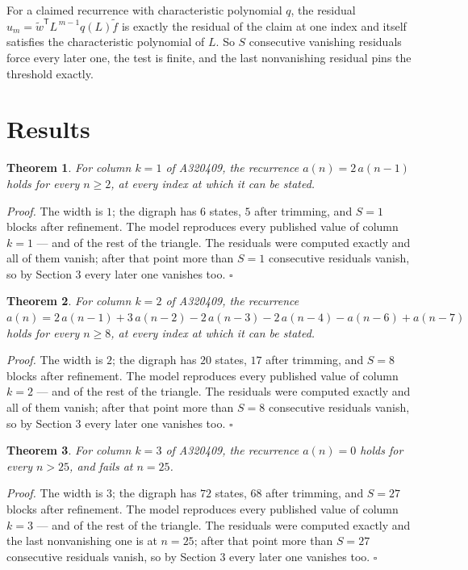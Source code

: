 \documentclass[11pt]{article}
\newtheorem{theorem}{Theorem}
\theoremstyle{definition}
\begin{document}
For a claimed recurrence with characteristic polynomial $q$, the residual $u_m = \tilde w^{\mathsf T}L^{\,m-1}q(L)\tilde f$ is exactly the residual of the claim at one index and itself satisfies the characteristic polynomial of $L$. So $S$ consecutive vanishing residuals force every later one, the test is finite, and the last nonvanishing residual pins the threshold exactly.

\section{Results}

\begin{theorem} For column $k = 1$ of A320409, the recurrence $a(n) = 2\,a(n-1)$ holds for every $n \ge 2$, at every index at which it can be stated.\end{theorem}

{\itshape Proof.} The width is $1$; the digraph has $6$ states, $5$ after trimming, and $S = 1$ blocks after refinement. The model reproduces every published value of column $k = 1$ --- and of the rest of the triangle. The residuals were computed exactly and all of them vanish; after that point more than $S = 1$ consecutive residuals vanish, so by Section 3 every later one vanishes too. $\square$

\begin{theorem} For column $k = 2$ of A320409, the recurrence $a(n) = 2\,a(n-1) + 3\,a(n-2) - 2\,a(n-3) - 2\,a(n-4) - a(n-6) + a(n-7)$ holds for every $n \ge 8$, at every index at which it can be stated.\end{theorem}

{\itshape Proof.} The width is $2$; the digraph has $20$ states, $17$ after trimming, and $S = 8$ blocks after refinement. The model reproduces every published value of column $k = 2$ --- and of the rest of the triangle. The residuals were computed exactly and all of them vanish; after that point more than $S = 8$ consecutive residuals vanish, so by Section 3 every later one vanishes too. $\square$

\begin{theorem} For column $k = 3$ of A320409, the recurrence $a(n) = 0$ holds for every $n > 25$, and fails at $n = 25$.\end{theorem}

{\itshape Proof.} The width is $3$; the digraph has $72$ states, $68$ after trimming, and $S = 27$ blocks after refinement. The model reproduces every published value of column $k = 3$ --- and of the rest of the triangle. The residuals were computed exactly and the last nonvanishing one is at $n = 25$; after that point more than $S = 27$ consecutive residuals vanish, so by Section 3 every later one vanishes too. $\square$
\end{document}
